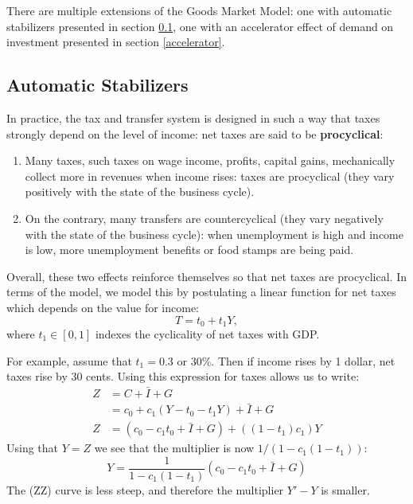 \documentclass[]{book}
\begin{document}
There are multiple extensions of the Goods Market Model: one with
automatic stabilizers presented in section \ref{automatic}, one with an
accelerator effect of demand on investment presented in section
\ref{accelerator}.

\subsection{Automatic Stabilizers}\label{automatic}

In practice, the tax and transfer system is designed in such a way that
taxes strongly depend on the level of income: net taxes are said to be
\textbf{procyclical}:

\begin{enumerate}
\def\labelenumi{\arabic{enumi}.}
\item
  Many taxes, such taxes on wage income, profits, capital gains,
  mechanically collect more in revenues when income rises: taxes are
  procyclical (they vary positively with the state of the business
  cycle).
\item
  On the contrary, many transfers are countercyclical (they vary
  negatively with the state of the business cycle): when unemployment is
  high and income is low, more unemployment benefits or food stamps are
  being paid.
\end{enumerate}

Overall, these two effects reinforce themselves so that net taxes are
procyclical. In terms of the model, we model this by postulating a
linear function for net taxes which depends on the value for income:
\[T=t_{0}+t_{1}Y,\] where \(t_1 \in [0,1]\) indexes the cyclicality of
net taxes with GDP.

For example, assume that \(t_1=0.3\) or 30\%. Then if income rises by 1
dollar, net taxes rise by 30 cents. Using this expression for taxes
allows us to write: \[
\begin{aligned}
Z   &=C+\bar{I}+G\\
    &=c_{0}+c_{1}\left(Y-t_{0}-t_{1}Y\right)+\bar{I}+G\\
Z   &=\left(c_{0}-c_{1}t_{0}+\bar{I}+G\right)+\left(\left(1-t_{1}\right)c_{1}\right)Y
\end{aligned}
\] Using that \(Y=Z\) we see that the multiplier is now
\(1/(1-c_1(1-t_1))\):
\[Y=\frac{1}{1-c_{1}\left(1-t_{1}\right)}\left(c_{0}-c_{1}t_{0}+\bar{I}+G\right)\]
The (ZZ) curve is less steep, and therefore the multiplier \(Y'-Y\) is
smaller.
\end{document}
